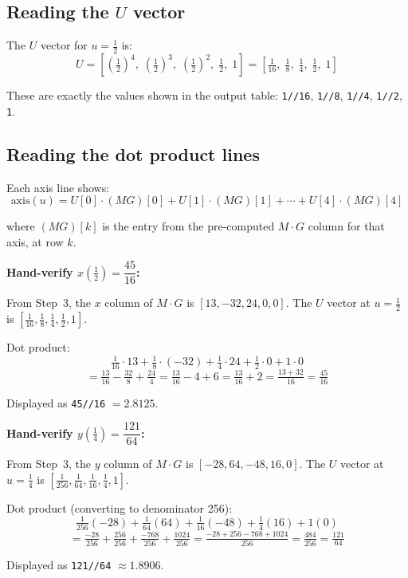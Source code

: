 \documentclass[12pt, a4paper]{article}
\newcommand{\cd}[1]{\texttt{#1}}
\begin{document}
\subsection{Reading the $U$ vector}

The $U$ vector for $u = \tfrac{1}{2}$ is:
\[
  U = \left[\left(\tfrac{1}{2}\right)^4,\;
            \left(\tfrac{1}{2}\right)^3,\;
            \left(\tfrac{1}{2}\right)^2,\;
            \tfrac{1}{2},\;
            1\right]
  = \left[\tfrac{1}{16},\; \tfrac{1}{8},\; \tfrac{1}{4},\;
          \tfrac{1}{2},\; 1\right]
\]

These are exactly the values shown in the output table:
\cd{1//16}, \cd{1//8}, \cd{1//4}, \cd{1//2}, \cd{1}.

\subsection{Reading the dot product lines}

Each axis line shows:
\[
  \text{axis}(u) = U[0] \cdot (MG)[0] + U[1] \cdot (MG)[1]
  + \cdots + U[4] \cdot (MG)[4]
\]

where $(MG)[k]$ is the entry from the pre-computed $M \cdot G$
column for that axis, at row $k$.

\begin{examplebox}
\textbf{Hand-verify $x\!\left(\tfrac{1}{2}\right) = \dfrac{45}{16}$:}

From Step~3, the $x$ column of $M \cdot G$ is $[13, -32, 24, 0, 0]$.
The $U$ vector at $u = \tfrac{1}{2}$ is
$[\tfrac{1}{16}, \tfrac{1}{8}, \tfrac{1}{4}, \tfrac{1}{2}, 1]$.

Dot product:
\[
  \tfrac{1}{16} \cdot 13
  + \tfrac{1}{8} \cdot (-32)
  + \tfrac{1}{4} \cdot 24
  + \tfrac{1}{2} \cdot 0
  + 1 \cdot 0
\]
\[
  = \tfrac{13}{16} - \tfrac{32}{8} + \tfrac{24}{4}
  = \tfrac{13}{16} - 4 + 6
  = \tfrac{13}{16} + 2
  = \tfrac{13 + 32}{16}
  = \tfrac{45}{16}
\]

Displayed as \cd{45//16} $= 2.8125$. \checkmark
\end{examplebox}

\begin{examplebox}
\textbf{Hand-verify $y\!\left(\tfrac{1}{4}\right) = \dfrac{121}{64}$:}

From Step~3, the $y$ column of $M \cdot G$ is $[-28, 64, -48, 16, 0]$.
The $U$ vector at $u = \tfrac{1}{4}$ is
$[\tfrac{1}{256}, \tfrac{1}{64}, \tfrac{1}{16}, \tfrac{1}{4}, 1]$.

Dot product (converting to denominator 256):
\[
  \tfrac{1}{256}(-28) + \tfrac{1}{64}(64) + \tfrac{1}{16}(-48)
  + \tfrac{1}{4}(16) + 1(0)
\]
\[
  = \tfrac{-28}{256} + \tfrac{256}{256} + \tfrac{-768}{256}
  + \tfrac{1024}{256}
  = \tfrac{-28 + 256 - 768 + 1024}{256}
  = \tfrac{484}{256}
  = \tfrac{121}{64}
\]

Displayed as \cd{121//64} $\approx 1.8906$. \checkmark
\end{examplebox}
\end{document}
